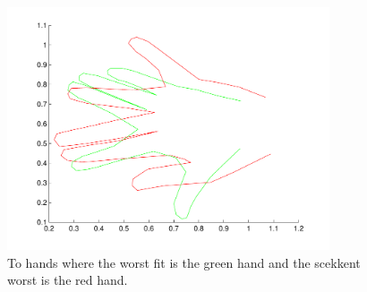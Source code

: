 \begin{figure}[!htbp]
  \centering
  \includegraphics[width=0.85\textwidth]{./images/q33}
  \caption{To hands where the worst fit is the green hand and the scekkent worst is the red hand.}
  \label{fig:q33}
\end{figure}




